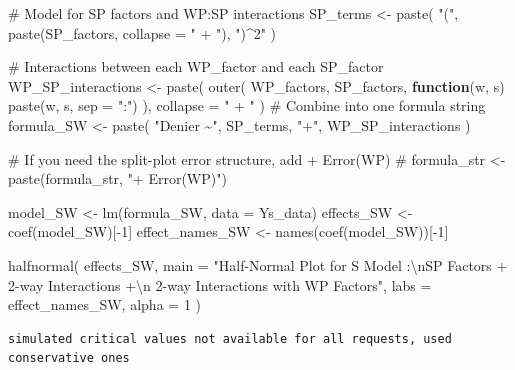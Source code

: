 \documentclass[
  letterpaper,
  DIV=11,
  numbers=noendperiod]{scrartcl}
\newenvironment{Shaded}{\begin{snugshade}}{\end{snugshade}}
\newcommand{\AttributeTok}[1]{\textcolor[rgb]{0.40,0.45,0.13}{#1}}
\newcommand{\CommentTok}[1]{\textcolor[rgb]{0.37,0.37,0.37}{#1}}
\newcommand{\ControlFlowTok}[1]{\textcolor[rgb]{0.00,0.23,0.31}{\textbf{#1}}}
\newcommand{\DecValTok}[1]{\textcolor[rgb]{0.68,0.00,0.00}{#1}}
\newcommand{\FunctionTok}[1]{\textcolor[rgb]{0.28,0.35,0.67}{#1}}
\newcommand{\NormalTok}[1]{\textcolor[rgb]{0.00,0.23,0.31}{#1}}
\newcommand{\OtherTok}[1]{\textcolor[rgb]{0.00,0.23,0.31}{#1}}
\newcommand{\SpecialCharTok}[1]{\textcolor[rgb]{0.37,0.37,0.37}{#1}}
\newcommand{\StringTok}[1]{\textcolor[rgb]{0.13,0.47,0.30}{#1}}
\begin{document}
\begin{Shaded}
\begin{Highlighting}[]
\CommentTok{\# Model for SP factors and WP:SP interactions}
\NormalTok{SP\_terms }\OtherTok{\textless{}{-}} \FunctionTok{paste}\NormalTok{(}
  \StringTok{"("}\NormalTok{, }
  \FunctionTok{paste}\NormalTok{(SP\_factors, }\AttributeTok{collapse =} \StringTok{" + "}\NormalTok{), }
  \StringTok{")\^{}2"}
\NormalTok{)}

\CommentTok{\# Interactions between each WP\_factor and each SP\_factor}
\NormalTok{WP\_SP\_interactions }\OtherTok{\textless{}{-}} \FunctionTok{paste}\NormalTok{(}
  \FunctionTok{outer}\NormalTok{(}
\NormalTok{    WP\_factors,}
\NormalTok{    SP\_factors,}
    \ControlFlowTok{function}\NormalTok{(w, s) }\FunctionTok{paste}\NormalTok{(w, s, }\AttributeTok{sep =} \StringTok{":"}\NormalTok{)}
\NormalTok{  ),}
  \AttributeTok{collapse =} \StringTok{" + "}
\NormalTok{)}
\CommentTok{\# Combine into one formula string}
\NormalTok{formula\_SW }\OtherTok{\textless{}{-}} \FunctionTok{paste}\NormalTok{(}
  \StringTok{"Denier \textasciitilde{}"}\NormalTok{,}
\NormalTok{  SP\_terms,}
  \StringTok{"+"}\NormalTok{,}
\NormalTok{  WP\_SP\_interactions}
\NormalTok{)}

\CommentTok{\# If you need the split{-}plot error structure, add + Error(WP)}
\CommentTok{\# formula\_str \textless{}{-} paste(formula\_str, "+ Error(WP)")}


\NormalTok{model\_SW }\OtherTok{\textless{}{-}} \FunctionTok{lm}\NormalTok{(formula\_SW, }\AttributeTok{data =}\NormalTok{ Ys\_data)}
\NormalTok{effects\_SW }\OtherTok{\textless{}{-}} \FunctionTok{coef}\NormalTok{(model\_SW)[}\SpecialCharTok{{-}}\DecValTok{1}\NormalTok{]}
\NormalTok{effect\_names\_SW }\OtherTok{\textless{}{-}} \FunctionTok{names}\NormalTok{(}\FunctionTok{coef}\NormalTok{(model\_SW))[}\SpecialCharTok{{-}}\DecValTok{1}\NormalTok{]}

\FunctionTok{halfnormal}\NormalTok{(}
\NormalTok{  effects\_SW,}
  \AttributeTok{main =} \StringTok{"Half{-}Normal Plot for S Model :}\SpecialCharTok{\textbackslash{}n}\StringTok{SP Factors + 2{-}way Interactions +}\SpecialCharTok{\textbackslash{}n}\StringTok{ 2{-}way Interactions with WP Factors"}\NormalTok{,}
  \AttributeTok{labs =}\NormalTok{ effect\_names\_SW,}
  \AttributeTok{alpha =} \DecValTok{1}
\NormalTok{)}
\end{Highlighting}
\end{Shaded}

\begin{verbatim}
simulated critical values not available for all requests, used conservative ones
\end{verbatim}
\end{document}
